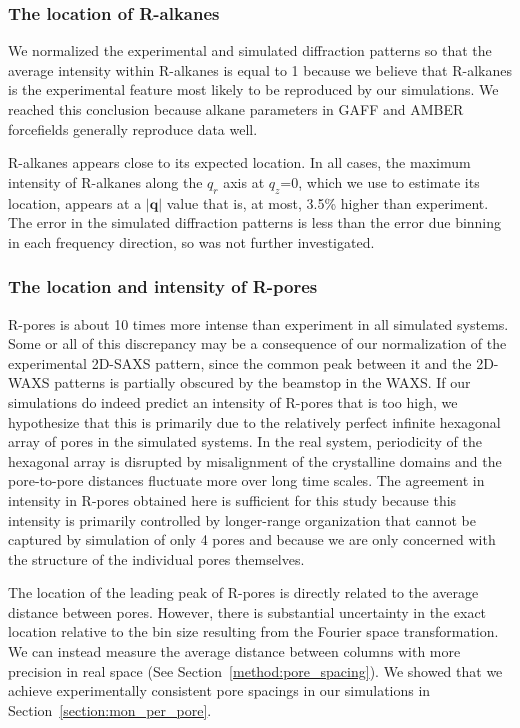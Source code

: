 \documentclass[journal=jpcbfk,manuscript=article]{achemso}
\begin{document}
  \subsubsection{The location of R-alkanes}\label{section:ralkanes}

  We normalized the experimental and simulated diffraction patterns so that the
  average intensity within R-alkanes is equal to 1 because we believe that
  R-alkanes is the experimental feature most likely to be reproduced by our
  simulations. We reached this conclusion because alkane parameters in GAFF and
  AMBER forcefields generally reproduce data
  well.~\cite{wang_development_2004,caleman_force_2012} 

  R-alkanes appears close to its expected location. In all cases, the maximum
  intensity of R-alkanes along the $q_r$ axis at $q_z$=0, which we use to
  estimate its location, appears at a $|\mathbf{q}|$ value that is, at most,
  3.5\% higher than experiment. The error in the simulated diffraction patterns
  is less than the error due binning in each frequency direction, so was not
  further investigated. 

  \subsubsection{The location and intensity of R-pores}\label{section:rpores}
  
  R-pores is about 10 times more intense than experiment in all simulated
  systems. Some or all of this discrepancy may be a consequence of our
  normalization of the experimental 2D-SAXS pattern, since the common peak
  between it and the 2D-WAXS patterns is partially obscured by the beamstop in
  the WAXS. If our simulations do indeed predict an intensity of R-pores that is
  too high, we hypothesize that this is primarily due to the relatively perfect
  infinite hexagonal array of pores in the simulated systems. In the real system,
  periodicity of the hexagonal array is disrupted by misalignment of the
  crystalline domains and the pore-to-pore distances fluctuate more over long
  time scales. The agreement in intensity in R-pores obtained here is sufficient for this
  study because this intensity is primarily controlled by longer-range
  organization that cannot be captured by simulation of only 4 pores and because
  we are only concerned with the structure of the individual pores themselves. 
  
  The location of the leading peak of R-pores is directly related to the
  average distance between pores. However, there is substantial uncertainty in
  the exact location relative to the bin size resulting from the Fourier space
  transformation. We can instead measure the average distance between columns
  with more precision in real space (See Section~\ref{method:pore_spacing}). We
  showed that we achieve experimentally consistent pore spacings in our
  simulations in Section~\ref{section:mon_per_pore}. 
\end{document}
